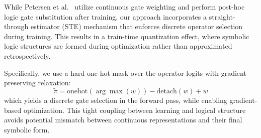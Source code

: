 While Petersen et al.~\cite{petersen2022deep} utilize continuous gate weighting and perform post-hoc logic gate substitution after training, our approach incorporates a straight-through estimator (STE) mechanism that enforces discrete operator selection during training. This results in a train-time quantization effect, where symbolic logic structures are formed during optimization rather than approximated retrospectively.

Specifically, we use a hard one-hot mask over the operator logits with gradient-preserving relaxation:
\[
\tilde{\pi} = \text{onehot}(\arg\max(w)) - \text{detach}(w) + w
\]
which yields a discrete gate selection in the forward pass, while enabling gradient-based optimization. This tight coupling between learning and logical structure avoids potential mismatch between continuous representations and their final symbolic form.

